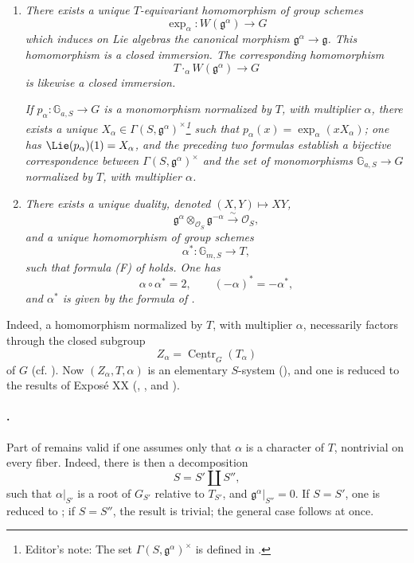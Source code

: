 \begin{enumerate}
\item[\SGAInlineRefTarget{sga3:xxii:thm:1.1:item:i}(i)] \textit{There exists a unique \(T\)-equivariant
homomorphism of group schemes}
\[
  \exp_{\alpha}:W(\mathfrak g^{\alpha})\longrightarrow G
\]
\textit{which induces on Lie algebras the canonical morphism
\(\mathfrak g^{\alpha}\to\mathfrak g\). This homomorphism is a closed
immersion. The corresponding homomorphism}
\[
  T\mathbin{\cdot_{\alpha}}W(\mathfrak g^{\alpha})
  \longrightarrow G
\]
\textit{is likewise a closed immersion.}

\textit{If
\(p_{\alpha}:\mathbb G_{a,S}\to G\) is a monomorphism normalized by
\(T\), with multiplier \(\alpha\), there exists a unique
\(X_{\alpha}\in\Gamma(S,\mathfrak g^{\alpha})^{\times}\)\footnote{Editor's
note: The set
\(\Gamma(S,\mathfrak g^{\alpha})^{\times}\) is defined in .} such that
\(p_{\alpha}(x)=\exp_{\alpha}(xX_{\alpha})\); one has
\(\Lie(p_{\alpha})(1)=X_{\alpha}\), and the preceding two formulas
establish a bijective correspondence between
\(\Gamma(S,\mathfrak g^{\alpha})^{\times}\) and the set of
monomorphisms \(\mathbb G_{a,S}\to G\) normalized by \(T\), with
multiplier \(\alpha\).}

\item[(ii)] \textit{There exists a unique duality, denoted
\((X,Y)\longmapsto XY\),}
\[
  \mathfrak g^{\alpha}\otimes_{\mathcal O_S}\mathfrak g^{-\alpha}
  \xrightarrow{\;\sim\;}\mathcal O_S,
\]
\textit{and a unique homomorphism of group schemes}
\[
  \alpha^*:\mathbb G_{m,S}\longrightarrow T,
\]
\textit{such that formula \textup{(F)} of  holds. One
has}
\[
  \alpha\circ\alpha^*=2,
  \qquad
  (-\alpha)^*=-\alpha^*,
\]
\textit{and \(\alpha^*\) is given by the formula of .}
\end{enumerate}

Indeed, a homomorphism normalized by \(T\), with multiplier \(\alpha\),
necessarily factors through the closed subgroup
\[
  Z_\alpha=\underline{\operatorname{Centr}}_G(T_\alpha)
\]
of \(G\) (cf. ). Now \((Z_\alpha,T,\alpha)\) is an
elementary \(S\)-system (), and one is reduced to the
results of Exposé XX (, , and ).

\paragraph{.}
Part  of  remains valid if one assumes only that
\(\alpha\) is a character of \(T\), nontrivial on every fiber. Indeed,
there is then a decomposition
\[
  S=S'\amalg S'',
\]
such that \(\alpha|_{S'}\) is a root of \(G_{S'}\) relative to
\(T_{S'}\), and
\(\mathfrak g^\alpha|_{S''}=0\). If \(S=S'\), one is reduced to ;
if \(S=S''\), the result is trivial; the general case follows at once.

